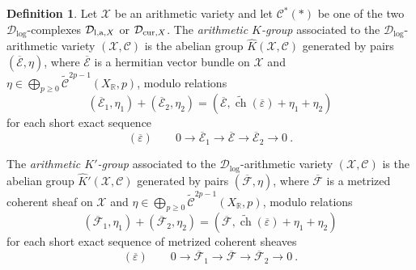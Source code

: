 \documentclass[10pt,twoside]{article}
\numberwithin{equation}{section}
\theoremstyle{plain}
\theoremstyle{definition}
\newtheorem{definition}[equation]{Definition}
\DeclareMathOperator{\ch}{ch}
\newcommand{\las}{{\text{\rm l,a}}}
\newcommand{\D}{\text{{\rm cur}}}
\begin{document}
\begin{definition}
Let $\mathcal{X}$ be an arithmetic variety and
let $\mathcal{C}^{\ast}(\ast)$ be one of the two $\mathcal{D}_{\log}$-complexes
$\mathcal{D}_{\las,X}$ or $\mathcal{D}_{\D, X}$. The
\textit{arithmetic $K$-group} associated to the 
$\mathcal{D}_{\log}$-arithmetic variety $(\mathcal{X},
\mathcal{C})$ is the abelian group
$\widehat{K}(\mathcal{X},\mathcal{C})$ generated by pairs
$(\overline{\mathcal{E}},\eta)$, where $\overline{\mathcal{E}}$ is a
hermitian vector bundle on $\mathcal{X}$ and $\eta\in\bigoplus_{p\geq
0} \widetilde{\mathcal{C}}^{2p-1}(X_{\mathbb{R}},p)$, modulo relations
\begin{equation}\label{equivKgr}
(\overline{\mathcal{E}}_1,\eta_1)+(\overline{\mathcal{E}}_2,\eta_2)=
(\overline{\mathcal{E}},\tilde{\ch}(\overline{\varepsilon})+
\eta_1+\eta_2)  
\end{equation}
for each short exact sequence
$$(\overline{\varepsilon})\qquad 0 \longrightarrow
\overline{\mathcal{E}}_{1} \longrightarrow \overline{\mathcal{E}}
\longrightarrow \overline{\mathcal{E}}_{2} \longrightarrow 0\ .$$

The \textit{arithmetic $K'$-group} associated to the
$\mathcal{D}_{\log}$-arithmetic variety $(\mathcal{X},
\mathcal{C})$ is 
the abelian group
$\widehat{K}'(\mathcal{X},\mathcal{C})$ generated by pairs
$(\overline{\mathcal{F}},\eta)$, where $\overline{\mathcal{F}}$ is a
metrized coherent sheaf on $\mathcal{X}$ and $\eta\in\bigoplus_{p\geq
0} \widetilde {\mathcal{C}}^{2p-1}(X_{\mathbb{R}},p)$, modulo
relations 
\begin{equation}\label{equivKprim}
(\overline{\mathcal{F}}_1,\eta_1)+(\overline{\mathcal{F}}_2,\eta_2)=
(\overline{\mathcal{F}},\tilde{\ch}(\overline{\varepsilon})+\eta_1+\eta_2)
\end{equation}
for each short exact sequence of metrized coherent sheaves
$$(\overline{\varepsilon})\qquad 0 \longrightarrow
\overline{\mathcal{F}}_{1} \longrightarrow \overline{\mathcal{F}}
\longrightarrow \overline{\mathcal{F}}_{2} \longrightarrow 0\ .$$
\end{definition}
\end{document}
